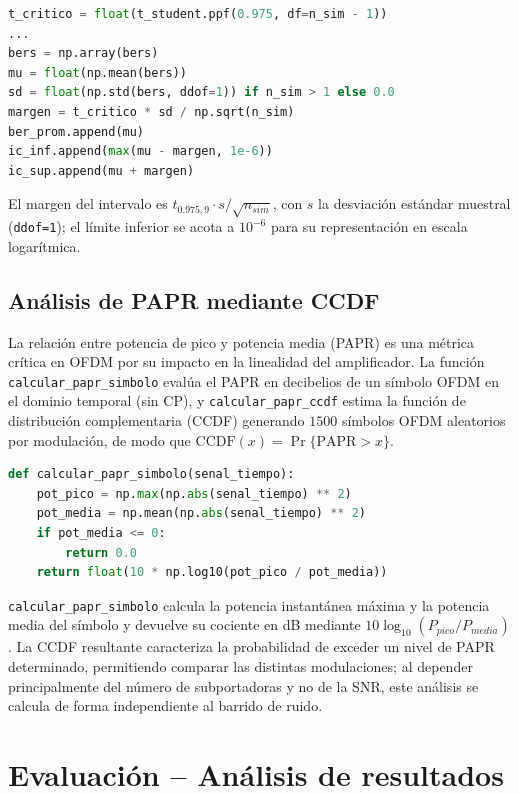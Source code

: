 \documentclass[conference,onecolumn]{IEEEtran}
\begin{document}
\begin{lstlisting}[language=Python]
t_critico = float(t_student.ppf(0.975, df=n_sim - 1))
...
bers = np.array(bers)
mu = float(np.mean(bers))
sd = float(np.std(bers, ddof=1)) if n_sim > 1 else 0.0
margen = t_critico * sd / np.sqrt(n_sim)
ber_prom.append(mu)
ic_inf.append(max(mu - margen, 1e-6))
ic_sup.append(mu + margen)
\end{lstlisting}

El margen del intervalo es $t_{0.975,9}\cdot s/\sqrt{n_{sim}}$, con $s$ la desviaci\'on est\'andar muestral (\texttt{ddof=1}); el l\'imite inferior se acota a $10^{-6}$ para su representaci\'on en escala logar\'itmica.

\subsection{An\'alisis de PAPR mediante CCDF}

La relaci\'on entre potencia de pico y potencia media (PAPR) es una m\'etrica cr\'itica en OFDM por su impacto en la linealidad del amplificador. La funci\'on \texttt{calcular\_papr\_simbolo} eval\'ua el PAPR en decibelios de un s\'imbolo OFDM en el dominio temporal (sin CP), y \texttt{calcular\_papr\_ccdf} estima la funci\'on de distribuci\'on complementaria (CCDF) generando $1500$ s\'imbolos OFDM aleatorios por modulaci\'on, de modo que $\mathrm{CCDF}(x)=\Pr\{\mathrm{PAPR}>x\}$.

\begin{lstlisting}[language=Python]
def calcular_papr_simbolo(senal_tiempo):
    pot_pico = np.max(np.abs(senal_tiempo) ** 2)
    pot_media = np.mean(np.abs(senal_tiempo) ** 2)
    if pot_media <= 0:
        return 0.0
    return float(10 * np.log10(pot_pico / pot_media))
\end{lstlisting}

\texttt{calcular\_papr\_simbolo} calcula la potencia instant\'anea m\'axima y la potencia media del s\'imbolo y devuelve su cociente en dB mediante $10\log_{10}(P_{pico}/P_{media})$. La CCDF resultante caracteriza la probabilidad de exceder un nivel de PAPR determinado, permitiendo comparar las distintas modulaciones; al depender principalmente del n\'umero de subportadoras y no de la SNR, este an\'alisis se calcula de forma independiente al barrido de ruido.

\section{Evaluaci\'on -- An\'alisis de resultados}
\end{document}
